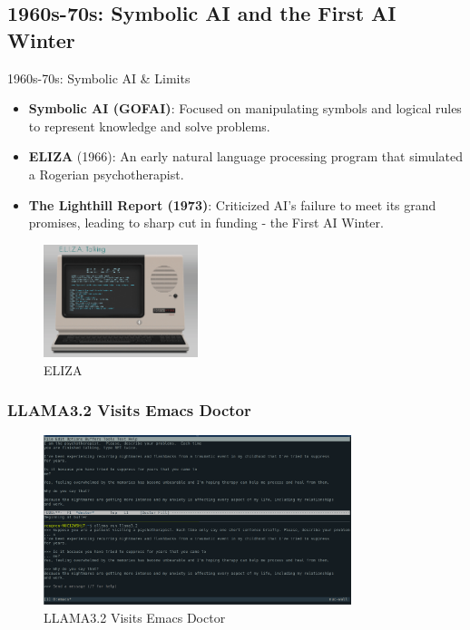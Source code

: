 \documentclass{beamer}
\begin{document}
\subsection{1960s-70s: Symbolic AI and the First AI Winter}

\begin{frame}[t]{1960s-70s: Symbolic AI \& Limits}
\begin{itemize}
    \item \textbf{Symbolic AI (GOFAI)}: Focused on manipulating symbols and logical rules to represent knowledge and solve problems.
    \item \textbf{ELIZA} (1966): An early natural language processing program that simulated a Rogerian psychotherapist.
    \item \textbf{The Lighthill Report (1973)}: Criticized AI's failure to meet its grand promises, leading to sharp cut in funding - the \alert{First AI Winter}.
\end{itemize}
\begin{figure}
    \includegraphics[width=0.4\textwidth]{images/eliza.png}
    \caption{ELIZA}
\end{figure}
\end{frame}

\begin{frame}[t]
    \frametitle{LLAMA3.2 Visits Emacs Doctor}
    
    \begin{figure}
    \begin{center}
        \includegraphics[width=0.8\textwidth]{images/doctor-llama.png}
    \end{center}
    \caption{LLAMA3.2 Visits Emacs Doctor}
    \end{figure}
    
\end{frame}
\end{document}
